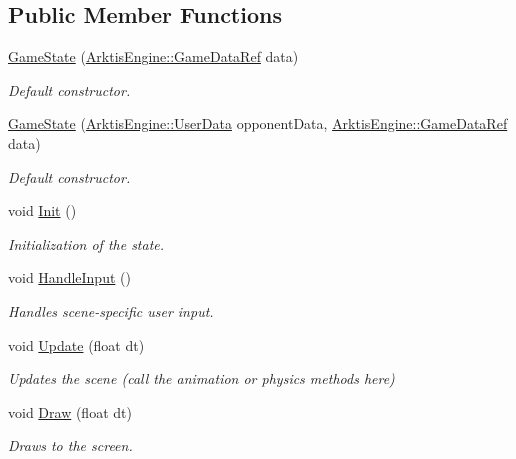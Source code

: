 \subsection*{Public Member Functions}
\begin{DoxyCompactItemize}
\item 
\mbox{\hyperlink{class_states_1_1_game_state_a04083789a08165586d338792e2def8fc}{Game\+State}} (\mbox{\hyperlink{namespace_arktis_engine_a52e783ae007274e2a6eccc201d9400a5}{Arktis\+Engine\+::\+Game\+Data\+Ref}} data)
\begin{DoxyCompactList}\small\item\em Default constructor. \end{DoxyCompactList}\item 
\mbox{\hyperlink{class_states_1_1_game_state_adf2486bf10bade0720d63f17d8199fc4}{Game\+State}} (\mbox{\hyperlink{struct_arktis_engine_1_1_user_data}{Arktis\+Engine\+::\+User\+Data}} opponent\+Data, \mbox{\hyperlink{namespace_arktis_engine_a52e783ae007274e2a6eccc201d9400a5}{Arktis\+Engine\+::\+Game\+Data\+Ref}} data)
\begin{DoxyCompactList}\small\item\em Default constructor. \end{DoxyCompactList}\item 
void \mbox{\hyperlink{class_states_1_1_game_state_aeb73979fc3a22b001ed389790e24bd1e}{Init}} ()
\begin{DoxyCompactList}\small\item\em Initialization of the state. \end{DoxyCompactList}\item 
void \mbox{\hyperlink{class_states_1_1_game_state_a6521d6d97ac2fb388085a70abce704a9}{Handle\+Input}} ()
\begin{DoxyCompactList}\small\item\em Handles scene-\/specific user input. \end{DoxyCompactList}\item 
void \mbox{\hyperlink{class_states_1_1_game_state_aceb987110e6ec94c3d6bf6f095b170cd}{Update}} (float dt)
\begin{DoxyCompactList}\small\item\em Updates the scene (call the animation or physics methods here) \end{DoxyCompactList}\item 
void \mbox{\hyperlink{class_states_1_1_game_state_a56f09cd84928af04b70405bb43511bad}{Draw}} (float dt)
\begin{DoxyCompactList}\small\item\em Draws to the screen. \end{DoxyCompactList}\end{DoxyCompactItemize}


